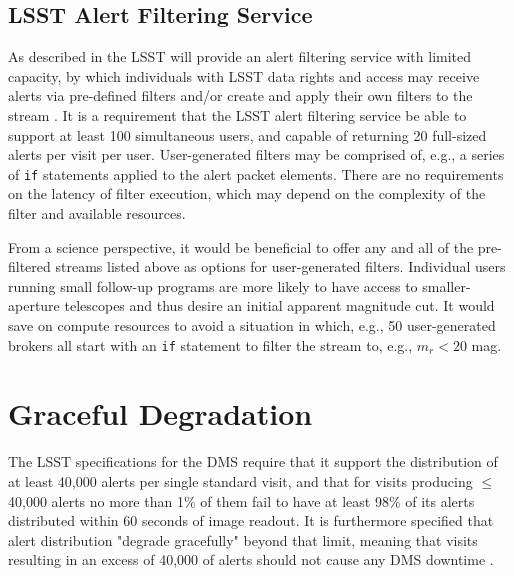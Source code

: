 \documentclass[DM,lsstdraft,authoryear,toc]{lsstdoc}
\begin{document}
\subsection{LSST Alert Filtering Service}\label{ssec:prefilter_lafs}

As described in  the LSST will provide an alert filtering service with limited capacity, by which individuals with LSST data rights and access may receive alerts via pre-defined filters and/or create and apply their own filters to the stream .
It is a requirement that the LSST alert filtering service be able to support at least 100 simultaneous users, and capable of returning 20 full-sized alerts per visit per user.
User-generated filters may be comprised of, e.g., a series of {\tt if} statements applied to the alert packet elements.
There are no requirements on the latency of filter execution, which may depend on the complexity of the filter and available resources. 

From a science perspective, it would be beneficial to offer any and all of the pre-filtered streams listed above as options for user-generated filters.
Individual users running small follow-up programs are more likely to have access to smaller-aperture telescopes and thus desire an initial apparent magnitude cut.
It would save on compute resources to avoid a situation in which, e.g., 50 user-generated brokers all start with an {\tt if} statement to filter the stream to, e.g., $m_r < 20$ mag. 






\clearpage
\section{Graceful Degradation} \label{sec:graceful}

The LSST specifications for the DMS require that it support the distribution of at least 40,000 alerts per single standard visit, and that for visits producing $\leq$40,000 alerts  no more than 1\% of them fail to have at least 98\% of its alerts distributed within 60 seconds of image readout.
It is furthermore specified that alert distribution "degrade gracefully" beyond that limit, meaning that visits resulting in an excess of 40,000 of alerts should not cause any DMS downtime .
\end{document}
